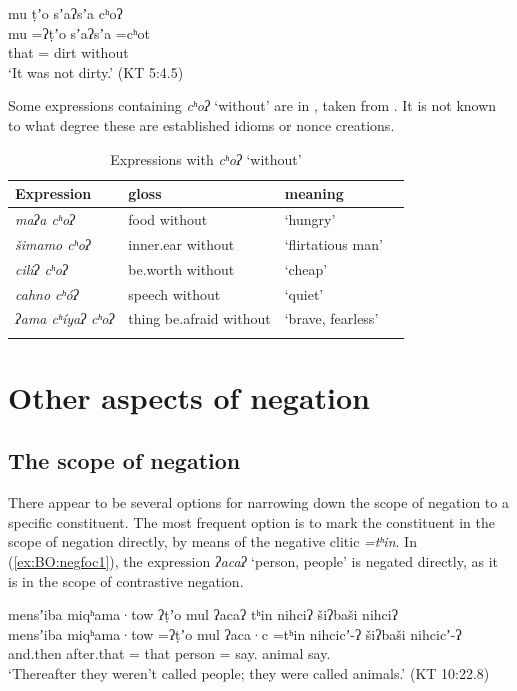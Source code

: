 \documentclass[output=paper,modfonts,nonflat,colorlinks,citecolor=brown]{langscibook}
\begin{document}
\ea 
\label{ex:BO:dirty}
\glll mu ṭʼo sʼaʔsʼa cʰoʔ\\
    mu =ʔṭʼo sʼaʔsʼa =cʰot\\
    that = dirt without\\
\glt `It was not dirty.' ({KT 5:4.5})\\
\z

\newpage
Some expressions containing \textit{cʰoʔ} `without' are in , taken from \citet{Oswalt}. It is not known to what degree these are established idioms or nonce creations.

\begin{table}
\caption{Expressions with \textit{cʰoʔ} `without'}
\label{tab:BO:deriv}
 \begin{tabular}{llll}
  \lsptoprule
  Expression & gloss & meaning \\
  \midrule
  \itshape maʔa cʰoʔ & food without & `hungry' & \\
  \itshape šimamo cʰoʔ & inner.ear without & `flirtatious man' \\
  \itshape ciliʔ cʰoʔ & be.worth without & `cheap' \\
  \itshape cahno cʰóʔ & speech without & `quiet' \\
  \itshape ʔama cʰíyaʔ cʰoʔ & thing be.afraid without & `brave, fearless' \\
  \lspbottomrule
 \end{tabular}
\end{table}

\section{Other aspects of negation}

\subsection{The scope of negation}
\label{sec:BO:scope}

There appear to be several options for narrowing down the scope of negation to a specific constituent. The most frequent option is to mark the constituent in the scope of negation directly, by means of the negative clitic \textit{=tʰin}. In (\ref{ex:BO:negfoc1}), the expression \textit{ʔacaʔ} `person, people' is negated directly, as it is in the scope of contrastive negation.

{%
\ea 
\label{ex:BO:negfoc1}
\glll mensʼiba miqʰama·tow ʔṭʼo mul ʔacaʔ tʰin nihciʔ šiʔbaši nihciʔ\\
    mensʼiba miqʰama·tow =ʔṭʼo mul ʔaca·c =tʰin nihcicʼ-ʔ šiʔbaši nihcicʼ-ʔ\\
    and.then after.that = that person = say. animal say.\\
\glt `Thereafter they weren’t called people; they were called animals.' ({KT 10:22.8})\\
\z
}%
\end{document}
